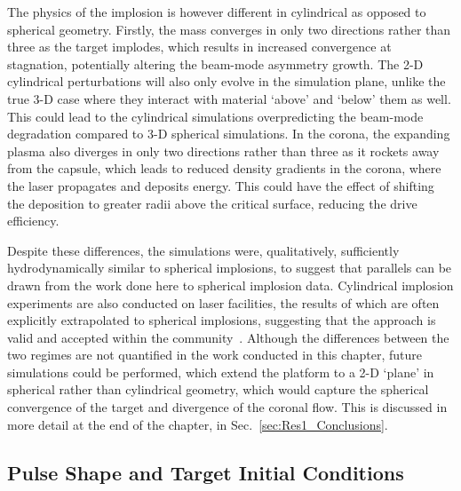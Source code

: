 The physics of the implosion is however different in cylindrical as opposed to spherical geometry.
Firstly, the mass converges in only two directions rather than three as the target implodes, which results in increased convergence at stagnation, potentially altering the beam-mode asymmetry growth.
The 2-D cylindrical perturbations will also only evolve in the simulation plane, unlike the true 3-D case where they interact with material `above' and `below' them as well.
This could lead to the cylindrical simulations overpredicting the beam-mode degradation compared to 3-D spherical simulations.
In the corona, the expanding plasma also diverges in only two directions rather than three as it rockets away from the capsule, which leads to reduced density gradients in the corona, where the laser propagates and deposits energy.
This could have the effect of shifting the deposition to greater radii above the critical surface, reducing the drive efficiency.

Despite these differences, the simulations were, qualitatively, sufficiently hydrodynamically similar to spherical implosions, to suggest that parallels can be drawn from the work done here to spherical implosion data.
Cylindrical implosion experiments are also conducted on laser facilities, the results of which are often explicitly extrapolated to spherical implosions, suggesting that the approach is valid and accepted within the community~\cite{perez-callejo_cylindrical_2022,tubbs_directdrive_1999}.
Although the differences between the two regimes are not quantified in the work conducted in this chapter, future simulations could be performed, which extend the platform to a 2-D `plane' in spherical rather than cylindrical geometry, which would capture the spherical convergence of the target and divergence of the coronal flow.
This is discussed in more detail at the end of the chapter, in Sec.~\ref{sec:Res1_Conclusions}.

\subsection{Pulse Shape and Target Initial Conditions}%
\label{sec:Res1_initialconditions}

